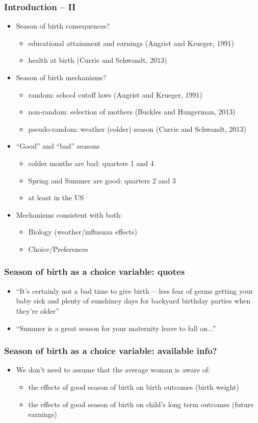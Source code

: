 \documentclass[10pt,letterpaper,subeqn]{beamer}
\begin{document}
\begin{frame}
\frametitle{Introduction -- II}
\begin{itemize}
\item Season of birth consequences?
\begin{itemize}
\item educational attainment and earnings (Angrist and Krueger, 1991)
\item health at birth (Currie and Schwandt, 2013)
\end{itemize}
\item Season of birth mechanisms?
\begin{itemize}
\item random: school cutoff laws (Angrist and Krueger, 1991)
\item non-random: selection of mothers (Buckles and Hungerman, 2013)
\item pseudo-random: weather (colder) season (Currie and Schwandt, 2013)
\end{itemize}
\item ``Good'' and ``bad'' seasons
\begin{itemize}
\item colder months are bad: quarters 1 and 4
\item Spring and Summer are good: quarters 2 and 3
\item at least in the US
\end{itemize}
\item Mechanisms consistent with both: 
\begin{itemize}
\item Biology (weather/influenza effects)
\item Choice/Preferences 
\end{itemize}
\end{itemize}
\end{frame}

\begin{frame}
\frametitle{Season of birth as a choice variable: quotes}
\begin{itemize}
\item ``It's certainly not a bad time to give birth ---less fear of germs getting your baby sick and plenty of sunshiney days for backyard birthday parties when they're older''
\item ``Summer is a great season for your maternity leave to fall on...''
\end{itemize}
\end{frame}


\begin{frame}
\frametitle{Season of birth as a choice variable: available info?}
\begin{itemize}
\item We don't need to assume that the average woman is aware of:
 \begin{itemize}
\item the effects of good season of birth on birth outcomes (birth weight)
\item the effects of good season of birth on child's long term outcomes (future earnings)
  \end{itemize}
\end{itemize}
\end{frame}
\end{document}
